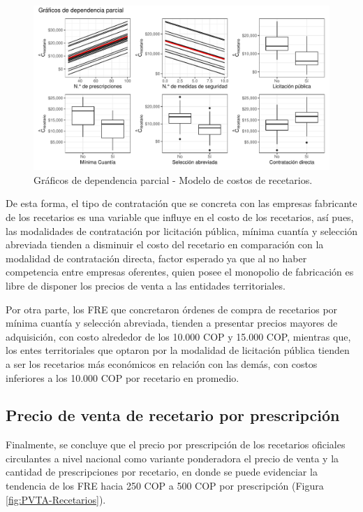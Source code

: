 \documentclass[
  oneside]{book}
\begin{document}
\begin{figure}

{\centering \includegraphics[width=0.9\linewidth]{InformeFinal_files/figure-latex/DependParcial1-1} 

}

\caption{Gráficos de dependencia parcial - Modelo de costos de recetarios.}\label{fig:DependParcial1}
\end{figure}

De esta forma, el tipo de contratación que se concreta con las empresas fabricante de los recetarios es una variable que influye en el costo de los recetarios, así pues, las modalidades de contratación por licitación pública, mínima cuantía y selección abreviada tienden a disminuir el costo del recetario en comparación con la modalidad de contratación directa, factor esperado ya que al no haber competencia entre empresas oferentes, quien posee el monopolio de fabricación es libre de disponer los precios de venta a las entidades territoriales.

Por otra parte, los FRE que concretaron órdenes de compra de recetarios por mínima cuantía y selección abreviada, tienden a presentar precios mayores de adquisición, con costo alrededor de los 10.000 COP y 15.000 COP, mientras que, los entes territoriales que optaron por la modalidad de licitación pública tienden a ser los recetarios más económicos en relación con las demás, con costos inferiores a los 10.000 COP por recetario en promedio.

\hypertarget{precio-de-venta-de-recetario-por-prescripciuxf3n}{%
\subsection{Precio de venta de recetario por prescripción}\label{precio-de-venta-de-recetario-por-prescripciuxf3n}}

Finalmente, se concluye que el precio por prescripción de los recetarios oficiales circulantes a nivel nacional como variante ponderadora el precio de venta y la cantidad de prescripciones por recetario, en donde se puede evidenciar la tendencia de los FRE hacia 250 COP a 500 COP por prescripción (Figura \ref{fig:PVTA-Recetarios}).
\end{document}
